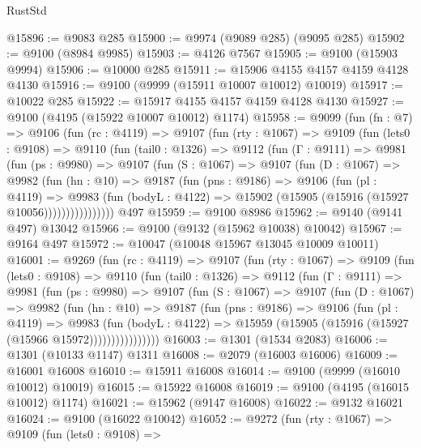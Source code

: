 \begin{lexlean}{RustStd}
\begin{coremodule}
@15896 := @9083 @285
@15900 := @9974 (@9089 @285) (@9095 @285)
@15902 := @9100 (@8984 @9985)
@15903 := @4126 @7567
@15905 := @9100 (@15903 @9994)
@15906 := @10000 @285
@15911 := @15906 @4155 @4157 @4159 @4128 @4130
@15916 := @9100 (@9999 (@15911 @10007 @10012) @10019)
@15917 := @10022 @285
@15922 := @15917 @4155 @4157 @4159 @4128 @4130
@15927 := @9100 (@4195 (@15922 @10007 @10012) @1174)
@15958 := @9099
    (fun (fn : @7) =>
    @9106
      (fun (rc : @4119) =>
      @9107
        (fun (rty : @1067) =>
        @9109
          (fun (lets0 : @9108) =>
          @9110
            (fun (tail0 : @1326) =>
            @9112
              (fun (Γ : @9111) =>
              @9981
                (fun (ps : @9980) =>
                @9107
                  (fun (S : @1067) =>
                  @9107
                    (fun (D : @1067) =>
                    @9982
                      (fun (hn : @10) =>
                      @9187
                        (fun (pns : @9186) =>
                        @9106
                          (fun (pl : @4119) =>
                          @9983
                            (fun (bodyL : @4122) =>
                            @15902 (@15905 (@15916 (@15927 @10056))))))))))))))))
    @497
@15959 := @9100 @8986
@15962 := @9140 (@9141 @497) @13042
@15966 := @9100 (@9132 (@15962 @10038) @10042)
@15967 := @9164 @497
@15972 := @10047 (@10048 @15967 @13045 @10009 @10011)
@16001 := @9269
    (fun (rc : @4119) =>
    @9107
      (fun (rty : @1067) =>
      @9109
        (fun (lets0 : @9108) =>
        @9110
          (fun (tail0 : @1326) =>
          @9112
            (fun (Γ : @9111) =>
            @9981
              (fun (ps : @9980) =>
              @9107
                (fun (S : @1067) =>
                @9107
                  (fun (D : @1067) =>
                  @9982
                    (fun (hn : @10) =>
                    @9187
                      (fun (pns : @9186) =>
                      @9106
                        (fun (pl : @4119) =>
                        @9983
                          (fun (bodyL : @4122) =>
                          @15959 (@15905 (@15916 (@15927 (@15966 @15972))))))))))))))))
@16003 := @1301 (@1534 @2083)
@16006 := @1301 (@10133 @1147) @1311
@16008 := @2079 (@16003 @16006)
@16009 := @16001 @16008
@16010 := @15911 @16008
@16014 := @9100 (@9999 (@16010 @10012) @10019)
@16015 := @15922 @16008
@16019 := @9100 (@4195 (@16015 @10012) @1174)
@16021 := @15962 (@9147 @16008)
@16022 := @9132 @16021
@16024 := @9100 (@16022 @10042)
@16052 := @9272
    (fun (rty : @1067) =>
    @9109
      (fun (lets0 : @9108) =>

\end{coremodule}
\end{lexlean}
